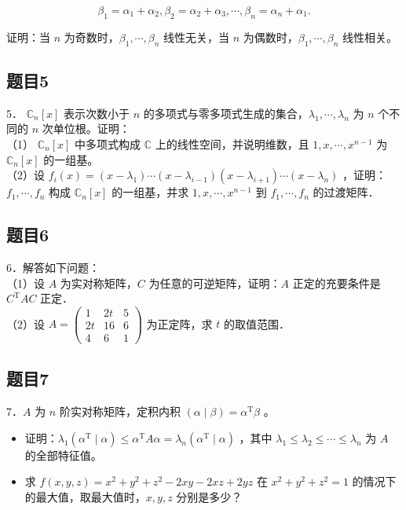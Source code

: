 \documentclass{article}
\begin{document}
\[
\beta_{1}=\alpha_{1}+\alpha_{2}, \beta_{2}=\alpha_{2}+\alpha_{3}, \cdots, \beta_{n}=\alpha_{n}+\alpha_{1} .
\]

证明：当 \(n\) 为奇数时，\(\beta_{1}, \cdots, \beta_{n}\) 线性无关，当 \(n\) 为偶数时，\(\beta_{1}, \cdots, \beta_{n}\) 线性相关。

\subsection{题目5}
5． \(\mathbb{C}_{n}[x]\) 表示次数小于 \(n\) 的多项式与零多项式生成的集合，\(\lambda_{1}, \cdots, \lambda_{n}\) 为 \(n\) 个不同的 \(n\) 次单位根。证明：\\
（1） \(\mathbb{C}_{n}[x]\) 中多项式构成 \(\mathbb{C}\) 上的线性空间，并说明维数，且 \(1, x, \cdots, x^{n-1}\) 为 \(\mathbb{C}_{n}[x]\) 的一组基。\\
（2）设 \(f_{i}(x)=\left(x-\lambda_{1}\right) \cdots\left(x-\lambda_{i-1}\right)\left(x-\lambda_{i+1}\right) \cdots\left(x-\lambda_{n}\right)\) ，证明：\(f_{1}, \cdots, f_{n}\) 构成 \(\mathbb{C}_{n}[x]\) 的一组基，并求 \(1, x, \cdots, x^{n-1}\) 到 \(f_{1}, \cdots, f_{n}\) 的过渡矩阵．

\subsection{题目6}
6．解答如下问题：\\
（1）设 \(A\) 为实对称矩阵，\(C\) 为任意的可逆矩阵，证明：\(A\) 正定的充要条件是 \(C^{\mathrm{T}} A C\) 正定．\\
（2）设 \(A=\left(\begin{array}{ccc}1 & 2 t & 5 \\ 2 t & 16 & 6 \\ 4 & 6 & 1\end{array}\right)\) 为正定阵，求 \(t\) 的取值范围．

\subsection{题目7}
7．\(A\) 为 \(n\) 阶实对称矩阵，定积内积 \((\alpha \mid \beta)=\alpha^{\mathrm{T}} \beta\) 。

\begin{itemize}
  \item[（1）] 证明：\(\lambda_{1}\left(\alpha^{\mathrm{T}} \mid \alpha\right) \leq \alpha^{\mathrm{T}} A \alpha=\lambda_{n}\left(\alpha^{\mathrm{T}} \mid \alpha\right)\) ，其中 \(\lambda_{1} \leq \lambda_{2} \leq \cdots \leq \lambda_{n}\) 为 \(A\) 的全部特征值。
  \item[（2）] 求 \(f(x, y, z)=x^{2}+y^{2}+z^{2}-2 x y-2 x z+2 y z\) 在 \(x^{2}+y^{2}+z^{2}=1\) 的情况下的最大值，取最大值时，\(x, y, z\) 分别是多少？
\end{itemize}
\end{document}
